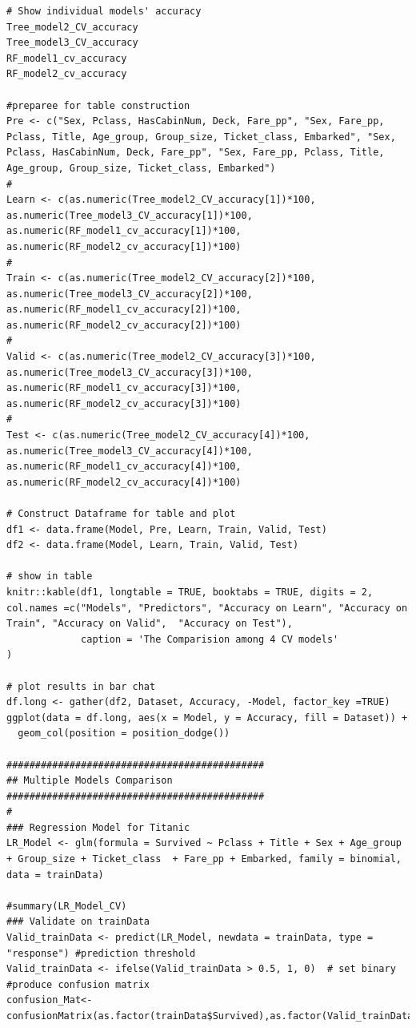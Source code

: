 \documentclass[
]{book}
\begin{document}
\begin{verbatim}
# Show individual models' accuracy
Tree_model2_CV_accuracy
Tree_model3_CV_accuracy
RF_model1_cv_accuracy
RF_model2_cv_accuracy

#preparee for table construction
Pre <- c("Sex, Pclass, HasCabinNum, Deck, Fare_pp", "Sex, Fare_pp, Pclass, Title, Age_group, Group_size, Ticket_class, Embarked", "Sex, Pclass, HasCabinNum, Deck, Fare_pp", "Sex, Fare_pp, Pclass, Title, Age_group, Group_size, Ticket_class, Embarked")
#
Learn <- c(as.numeric(Tree_model2_CV_accuracy[1])*100, as.numeric(Tree_model3_CV_accuracy[1])*100, as.numeric(RF_model1_cv_accuracy[1])*100, as.numeric(RF_model2_cv_accuracy[1])*100)
#
Train <- c(as.numeric(Tree_model2_CV_accuracy[2])*100, as.numeric(Tree_model3_CV_accuracy[2])*100, as.numeric(RF_model1_cv_accuracy[2])*100, as.numeric(RF_model2_cv_accuracy[2])*100)
#
Valid <- c(as.numeric(Tree_model2_CV_accuracy[3])*100, as.numeric(Tree_model3_CV_accuracy[3])*100, as.numeric(RF_model1_cv_accuracy[3])*100, as.numeric(RF_model2_cv_accuracy[3])*100)
#
Test <- c(as.numeric(Tree_model2_CV_accuracy[4])*100, as.numeric(Tree_model3_CV_accuracy[4])*100, as.numeric(RF_model1_cv_accuracy[4])*100, as.numeric(RF_model2_cv_accuracy[4])*100)

# Construct Dataframe for table and plot
df1 <- data.frame(Model, Pre, Learn, Train, Valid, Test)
df2 <- data.frame(Model, Learn, Train, Valid, Test)

# show in table
knitr::kable(df1, longtable = TRUE, booktabs = TRUE, digits = 2, col.names =c("Models", "Predictors", "Accuracy on Learn", "Accuracy on Train", "Accuracy on Valid",  "Accuracy on Test"),
             caption = 'The Comparision among 4 CV models'
)

# plot results in bar chat
df.long <- gather(df2, Dataset, Accuracy, -Model, factor_key =TRUE)
ggplot(data = df.long, aes(x = Model, y = Accuracy, fill = Dataset)) +
  geom_col(position = position_dodge())

#############################################
## Multiple Models Comparison
#############################################
#
### Regression Model for Titanic
LR_Model <- glm(formula = Survived ~ Pclass + Title + Sex + Age_group + Group_size + Ticket_class  + Fare_pp + Embarked, family = binomial, data = trainData)

#summary(LR_Model_CV)
### Validate on trainData
Valid_trainData <- predict(LR_Model, newdata = trainData, type = "response") #prediction threshold
Valid_trainData <- ifelse(Valid_trainData > 0.5, 1, 0)  # set binary
#produce confusion matrix
confusion_Mat<- confusionMatrix(as.factor(trainData$Survived),as.factor(Valid_trainData))


\end{verbatim}
\end{document}
